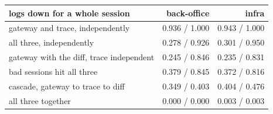 \begin{tabular}{lrr}
\toprule
logs down for a whole session & back-office & infra \\
\midrule
gateway and trace, independently & 0.936 / 1.000 & 0.943 / 1.000 \\
all three, independently & 0.278 / 0.926 & 0.301 / 0.950 \\
gateway with the diff, trace independent & 0.245 / 0.846 & 0.235 / 0.831 \\
bad sessions hit all three & 0.379 / 0.845 & 0.372 / 0.816 \\
cascade, gateway to trace to diff & 0.349 / 0.403 & 0.404 / 0.476 \\
all three together & 0.000 / 0.000 & 0.003 / 0.003 \\
\bottomrule
\end{tabular}
\par{}
